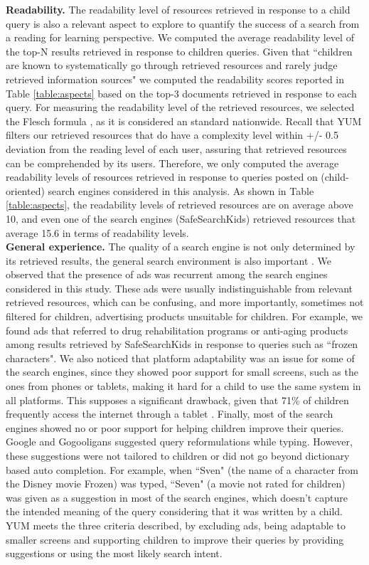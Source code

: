\documentclass{sig-alternate-05-2015}
\begin{document}
\noindent
\textbf{Readability.} The readability level of resources retrieved in response to a child query is also a relevant aspect to explore to quantify the success of a search from a reading for learning perspective. We computed the average readability level of the top-N results retrieved in response to children queries. Given that ``children are known to systematically go through retrieved resources and rarely judge retrieved information sources" \cite{Rie16} we computed the readability scores reported in Table \ref{table:aspects} based on the top-3 documents retrieved in response to each query. For measuring the readability level of the retrieved resources, we selected the Flesch formula \cite{Fle48}, as it is considered an standard nationwide. Recall that YUM filters our retrieved resources that do have a complexity level within +/- 0.5 deviation from the reading level of each user, assuring that retrieved resources can be comprehended by its users.   Therefore, we only computed the average readability levels of resources retrieved in response to queries posted on (child-oriented) search engines considered in this analysis. As shown in Table \ref{table:aspects}, the readability levels of retrieved resources are on average above 10, and even one of the search engines (SafeSearchKids) retrieved resources that average 15.6 in terms of readability levels.\\

\noindent
\textbf{General experience.} The quality of a search engine is not only determined by its retrieved results, the general search environment is also important \cite{Gos13}.  We observed that the presence of ads was recurrent among the search engines considered in this study. These ads were usually indistinguishable from relevant retrieved resources, which can be confusing, and more importantly, sometimes not filtered for children, advertising products unsuitable for children. For example, we found ads that referred to drug rehabilitation programs or anti-aging products among results retrieved by SafeSearchKids in response to queries such as ``frozen characters". We also noticed that platform adaptability was an issue for some of the search engines, since they showed poor support for small screens, such as the ones from phones or tablets, making it hard for a child to use the same system in all platforms. This supposes a significant drawback, given that 71\% of children frequently access the internet through a tablet \cite{ofcom}. Finally, most of the search engines showed no or poor support for helping children improve their queries. Google and Gogooligans suggested query reformulations while typing. However, these suggestions were not tailored to children or did not go beyond dictionary based auto completion. For example, when ``Sven" (the name of a character from the Disney movie Frozen) was typed, ``Seven" (a movie not rated for children) was given as a suggestion in most of the search engines, which doesn't capture  the intended meaning of the query considering that it was written by a child.  YUM  meets the three criteria described, by excluding ads, being adaptable to smaller screens and supporting children to improve their queries by providing suggestions or using the most likely search intent.\\
\end{document}
